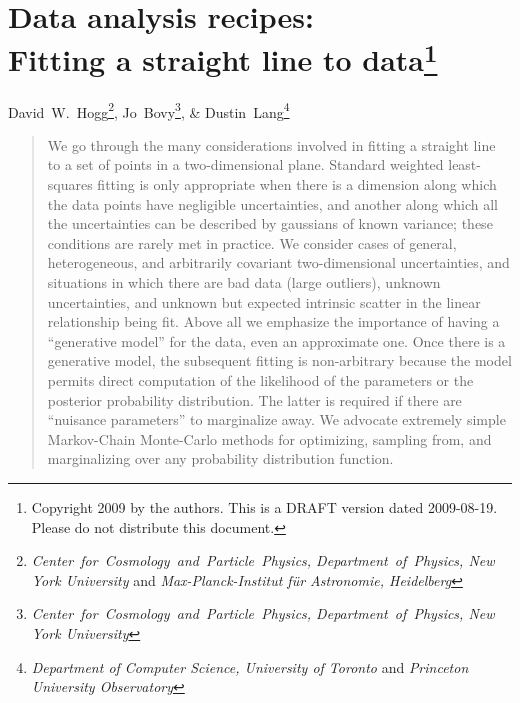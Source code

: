 \documentclass[12pt,twoside]{article}
\begin{document}
\thispagestyle{plain}\raggedbottom
\section*{Data analysis recipes:\ \\
  Fitting a straight line to data\footnote{
    Copyright 2009 by the authors.
    This is a DRAFT version dated 2009-08-19.
    Please do not distribute this document.}}

\noindent
David~W.~Hogg\footnote{\textsl{Center~for~Cosmology~and~Particle~Physics, Department~of~Physics, New York University} and \textsl{Max-Planck-Institut f\"ur Astronomie, Heidelberg}},
Jo~Bovy\footnote{\textsl{Center~for~Cosmology~and~Particle~Physics, Department~of~Physics, New York University}}, \&
Dustin~Lang\footnote{\textsl{Department of Computer Science, University of Toronto} and \textsl{Princeton University Observatory}}

\begin{abstract}
  We go through the many considerations involved in fitting a straight
  line to a set of points in a two-dimensional plane.  Standard
  weighted least-squares fitting is only appropriate when there is a
  dimension along which the data points have negligible uncertainties,
  and another along which all the uncertainties can be described by
  gaussians of known variance; these conditions are rarely met in
  practice.  We consider cases of general, heterogeneous, and
  arbitrarily covariant two-dimensional uncertainties, and situations
  in which there are bad data (large outliers), unknown uncertainties,
  and unknown but expected intrinsic scatter in the linear
  relationship being fit.  Above all we emphasize the importance of
  having a ``generative model'' for the data, even an approximate one.
  Once there is a generative model, the subsequent fitting is
  non-arbitrary because the model permits direct computation of the
  likelihood of the parameters or the posterior probability
  distribution.  The latter is required if there are ``nuisance
  parameters'' to marginalize away.  We advocate extremely simple
  Markov-Chain Monte-Carlo methods for optimizing, sampling from, and
  marginalizing over any probability distribution function.
\end{abstract}
\end{document}
